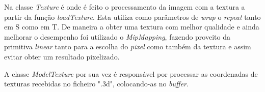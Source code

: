 \documentclass[relatorio.tex]{subfiles}
\begin{document}
Na classe \textit{Texture} é onde é feito o processamento da imagem com a textura
a partir da função \textit{loadTexture}. Esta utiliza como parâmetros de
\textit{wrap} o \textit{repeat} tanto em S como em T. De maneira a obter
uma textura com melhor qualidade e ainda melhorar o desempenho foi utilizado
o \textit{MipMapping}, fazendo proveito da primitiva \textit{linear} tanto para a 
escolha do \textit{pixel} como também da textura e assim evitar obter um resultado pixelizado.

A classe \textit{ModelTexture} por sua vez é responsável por processar as coordenadas de texturas
recebidas no ficheiro ".3d", colocando-as no \textit{buffer}.
\end{document}

